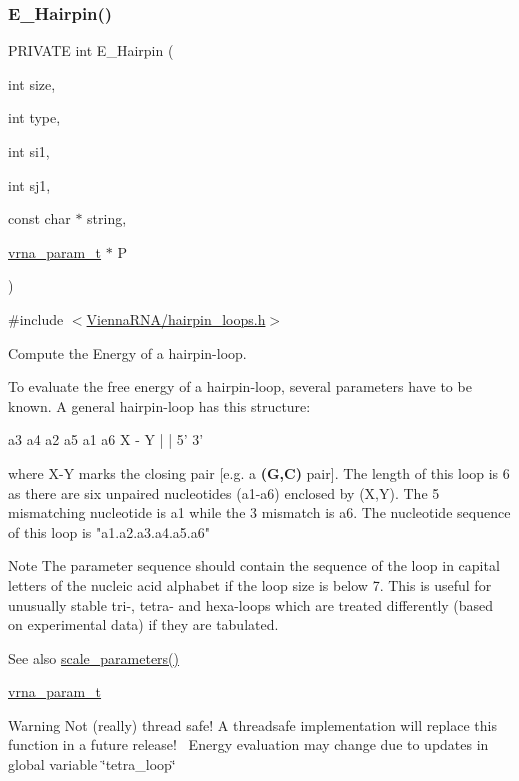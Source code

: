 \subsubsection{\texorpdfstring{E\+\_\+\+Hairpin()}{E\_Hairpin()}}
{\footnotesize\ttfamily P\+R\+I\+V\+A\+TE int E\+\_\+\+Hairpin (\begin{DoxyParamCaption}\item[{int}]{size,  }\item[{int}]{type,  }\item[{int}]{si1,  }\item[{int}]{sj1,  }\item[{const char $\ast$}]{string,  }\item[{\hyperlink{group__energy__parameters_ga8a69ca7d787e4fd6079914f5343a1f35}{vrna\+\_\+param\+\_\+t} $\ast$}]{P }\end{DoxyParamCaption})}



{\ttfamily \#include $<$\hyperlink{hairpin__loops_8h}{Vienna\+R\+N\+A/hairpin\+\_\+loops.\+h}$>$}



Compute the Energy of a hairpin-\/loop. 

To evaluate the free energy of a hairpin-\/loop, several parameters have to be known. A general hairpin-\/loop has this structure\+:~\newline
 
\begin{DoxyPre}
      a3 a4
    a2     a5
    a1     a6
      X - Y
      |   |
      5'  3'
\end{DoxyPre}
 where X-\/Y marks the closing pair \mbox{[}e.\+g. a {\bfseries (G,C)} pair\mbox{]}. The length of this loop is 6 as there are six unpaired nucleotides (a1-\/a6) enclosed by (X,Y). The 5\textquotesingle{} mismatching nucleotide is a1 while the 3\textquotesingle{} mismatch is a6. The nucleotide sequence of this loop is "a1.\+a2.\+a3.\+a4.\+a5.\+a6" ~\newline
 \begin{DoxyNote}{Note}
The parameter sequence should contain the sequence of the loop in capital letters of the nucleic acid alphabet if the loop size is below 7. This is useful for unusually stable tri-\/, tetra-\/ and hexa-\/loops which are treated differently (based on experimental data) if they are tabulated. 
\end{DoxyNote}
\begin{DoxySeeAlso}{See also}
\hyperlink{group__energy__parameters_ga541f2cf7436e9bc939b0a49b24baf987}{scale\+\_\+parameters()} 

\hyperlink{group__energy__parameters_ga8a69ca7d787e4fd6079914f5343a1f35}{vrna\+\_\+param\+\_\+t} 
\end{DoxySeeAlso}
\begin{DoxyWarning}{Warning}
Not (really) thread safe! A threadsafe implementation will replace this function in a future release!~\newline
Energy evaluation may change due to updates in global variable \char`\"{}tetra\+\_\+loop\char`\"{}
\end{DoxyWarning}

